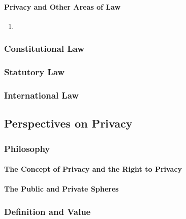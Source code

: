 \paragraph{Privacy and Other Areas of Law}

\begin{enumerate}
    \item %
\end{enumerate}

\subsubsection{Constitutional Law}


\subsubsection{Statutory Law}


\subsubsection{International Law}


\subsection{Perspectives on Privacy}

\subsubsection{Philosophy}

\paragraph{The Concept of Privacy and the Right to Privacy}


\paragraph{The Public and Private Spheres}


\subsubsection{Definition and Value}


